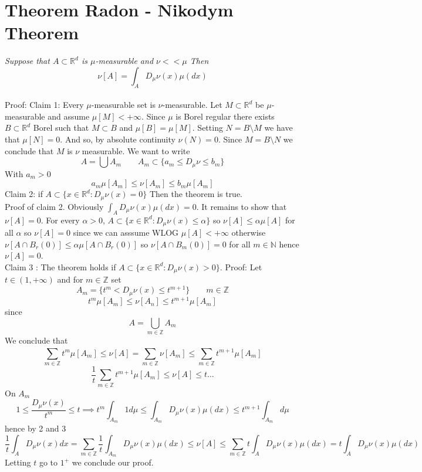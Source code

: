\documentclass[11pt]{article}
\begin{document}
\section{Theorem Radon - Nikodym Theorem}
\emph{
    Suppose that $A \subset \mathbb{R}^{d}$ is $ \mu $-measurable and $\nu << \mu$ Then
    \[
        \nu[A] = \int_{A}^{} D_\mu \nu(x) \mu(dx)
    \] 
}\\
Proof: Claim 1: Every $\mu$-measurable  set is $\nu$-measurable. Let  $M \subset \mathbb{R}^{d}$ be $ \mu $-measurable and assume $\mu[M] < +\infty$. Since
$\mu$ is Borel regular there exists $ B \subset \mathbb{R}^{d}$ Borel such that $M \subset B$ and $\mu[B] = \mu[M]$.
Setting $N = B \setminus M$ we have that  $\mu[N] = 0$. And so, by absolute continuity $\nu(N) = 0$. Since  $M = B \setminus N$ we conclude that  $M$ is $\nu$ measurable.
We want to write
\[
    A = \bigcup A_m \qquad A_m  \subset \{a_m \le D_\mu \nu \le b_m\}
\] 
With $a_m > 0$
\[
    a_m \mu[A_m] \le \nu[A_m] \le b_m \mu[A_m]
\] 
Claim 2: if $A \subset \{x \in \mathbb{R}^{d}: D_\mu \nu(x) = 0\}$ Then the theorem is true.
\\Proof of claim 2. Obviously $\int_{A}^{}D_\mu \nu(x)\mu(dx) = 0$. It remains to show that $\nu[A] = 0$. For every  $\alpha > 0$, $A \subset \{x \in \mathbb{R}^{d}: D_\mu\nu(x) \le \alpha\}$
so $\nu[A] \le \alpha \mu[A]$ for all $\alpha$ so $\nu[A] = 0$ since we can asssume  WLOG  $\mu[A] < +\infty$ otherwise $\nu[A \cap B_r(0)] \le \alpha \mu[A \cap B_r(0)] $
so $\nu[A \cap B_m(0)] = 0$ for all  $m \in \mathbb{N}$ hence $\nu[A] = 0$.\\
Claim 3 : The theorem holds if $A \subset \{x \in \mathbb{R}^{d} : D_\mu \nu(x) > 0\}$. Proof:
Let $t \in (1, +\infty)$ and for $m \in \mathbb{Z}$ set
\[
    A_m = \{t^{m} < D_\mu \nu(x) \le t^{m+1} \} \qquad m \in \mathbb{Z}
\] 
\[
    t^{m}\mu[A_m] \le \nu[A_n] \le t^{m+1}\mu[A_m]
\] 
since
\[
    A = \bigcup_{m \in  \mathbb{Z}} A_m
\] 
We conclude that
\[
    \sum_{m \in \mathbb{Z}}^{} t^{m}\mu[A_m] \le \nu[A] = \sum_{m \in \mathbb{Z}}^{}\nu[A_m] \le \sum_{m \in \mathbb{Z}}^{}t^{m+1}\mu[A_m]
\] 
\[
    \frac{1}{t} \sum_{m \in \mathbb{Z}}^{}t^{m+1}\mu[A_m] \le \nu[A] \le t \dots
\] 
On $A_m$ 
 \[
    1 \le  \frac{D_\mu \nu(x)}{t^{m}} \le t \implies t^{m}\int_{A_m}^{}1d \mu \le \int_{A_m}^{}D_\mu \nu(x) \mu(dx) \le t^{m+1}\int_{A_m}^{}d \mu
\] 
hence by 2 and 3
\[
  \frac{1}{t}\int_{A}^{}D_\mu\nu(x)dx = \sum_{m \in \mathbb{Z}}^{}\frac{1}{t}\int_{A_m}^{} D_\mu\nu(x)\mu(dx) \le \nu[A] \le \sum_{m \in \mathbb{Z}}^{}t \int_{A}^{} D_\mu\nu(x)\mu(dx) = t \int_{A}^{} D_\mu \nu(x)\mu(dx)
\] 
Letting $t$ go to $1^{+}$ we conclude our proof.
\end{document}
